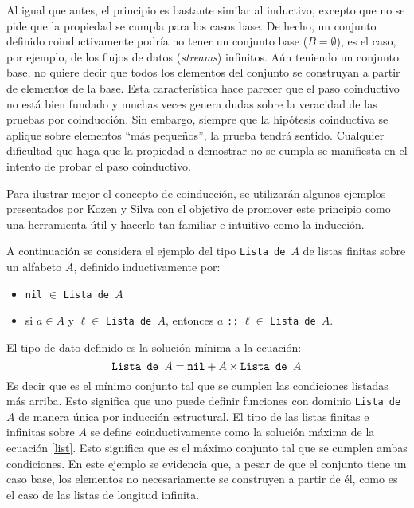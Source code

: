 Al igual que antes, el principio es bastante similar al inductivo, excepto que no se pide que la propiedad se cumpla para los casos base. De hecho, un conjunto definido coinductivamente podría no tener un conjunto base ($B = \emptyset$), es el caso, por ejemplo, de los flujos de datos (\textit{streams}) infinitos. Aún teniendo un conjunto base, no quiere decir que todos los elementos del conjunto se construyan a partir de elementos de la base. Esta característica hace parecer que el paso coinductivo no está bien fundado y muchas veces genera dudas sobre la veracidad de las pruebas por coinducción. Sin embargo, siempre que la hipótesis coinductiva se aplique sobre elementos ``más pequeños'', la prueba tendrá sentido. Cualquier dificultad que haga que la propiedad a demostrar no se cumpla se manifiesta en el intento de probar el paso coinductivo.

Para ilustrar mejor el concepto de coinducción, se utilizarán algunos ejemplos presentados por Kozen y Silva \cite{kozen:2017} con el objetivo de promover este principio como una herramienta útil y hacerlo tan familiar e intuitivo como la inducción. 

A continuación se considera el ejemplo del tipo \texttt{Lista de $A$} de listas finitas sobre un alfabeto $A$, definido inductivamente por:
\begin{itemize}[label=$\blacktriangleright$]
	\item \texttt{nil} $\in$ \texttt{Lista de $A$}
	\item si $a \in A$ y $\ell \in$ \texttt{Lista de $A$}, entonces $a$ \texttt{::} $\ell \in$ \texttt{Lista de $A$}. 
\end{itemize}

El tipo de dato definido es la solución  mínima a la ecuación:
\begin{equation}\label{list}
\text{\tt Lista de $A$} = \text{\tt nil} + A \times \text{\tt Lista de $A$}
\end{equation}
Es decir que es el mínimo conjunto tal que se cumplen las condiciones listadas más arriba. Esto significa que uno puede definir funciones con dominio \texttt{Lista de $A$} de manera única por inducción estructural. El tipo de las listas finitas e infinitas sobre $A$ se define coinductivamente como la solución máxima de la ecuación \ref{list}. Esto significa que es el máximo conjunto tal que se cumplen ambas condiciones. En este ejemplo se evidencia que, a pesar de que el conjunto tiene un caso base, los elementos no necesariamente se construyen a partir de él, como es el caso de las listas de longitud infinita.


